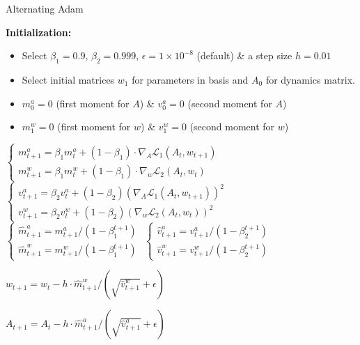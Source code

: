 \documentclass
[
    a4paper,
    DIV=11,
    abstract=true,
    11pt,
]
{scrartcl}
\theoremstyle{definition}
\begin{document}
\begin{algorithm}[h!]
\caption{Alternating Adam}
\begin{algorithmic}
\State \textbf{Initialization:}
\begin{itemize}
 \item Select $\beta_1 = 0.9$, $\beta_2=0.999$, $\epsilon=1 \times 10^{-8}$ (default) \& a step size $h=0.01$
 \item Select initial matrices $w_{1}$ for parameters in basis and $A_0$ for dynamics matrix.
 \item $m^a_0 = 0$ (first moment for $A$) \& $v^a_0 = 0$ (second moment for $A$)
 \item $m^w_1 = 0$ (first moment for $w$) \& $v^w_1 = 0$ (second moment for $w$)
 \end{itemize}
\State $\left\{
\begin{array}{l}
m^a_{t+1} = \beta_1 m^a_t + (1-\beta_1) \cdot \nabla_A \mathcal{L}_1(A_{t}, w_{t+1}) \\
m^w_{t+1} = \beta_1 m^w_t + (1-\beta_1) \cdot \nabla_w \mathcal{L}_2(A_t, w_{t})
\end{array}
\right. $ 
\State $\left\{
\begin{array}{l}
v^a_{t+1} = \beta_2 v^a_t + (1-\beta_2) (\nabla_A \mathcal{L}_1(A_{t}, w_{t+1}))^2 \\
v^w_{t+1} = \beta_2 v^w_t + (1-\beta_2) (\nabla_w \mathcal{L}_2(A_t, w_{t}))^2
\end{array}
\right. $ 
\State $ \left\{ \begin{array}{l}
\hat{m}_{t+1}^a = m^a_{t+1}/(1 - \beta_1^{t+1}) \\
\hat{m}_{t+1}^w = m^w_{t+1}/(1 - \beta_1^{t+1})
\end{array} \right. $ 
\State $ \left\{
\begin{array}{l}
\hat{v}_{t+1}^a = v^a_{t+1}/(1 - \beta_2^{t+1}) \\
\hat{v}_{t+1}^w = v^w_{t+1}/(1 - \beta_2^{t+1})
\end{array} \right. $ 

\State $w_{t+1} = w_t - h \cdot \hat{m}_{t+1}^w/(\sqrt{\hat{v}_{t+1}^w} + \epsilon)$  

\State $A_{t+1} = A_{t} - h \cdot \hat{m}_{t+1}^a/(\sqrt{\hat{v}_{t+1}^a} + \epsilon)$ 

\EndWhile
\end{algorithmic}
\label{alg:alt_adam_general}
\end{algorithm}
\end{document}

